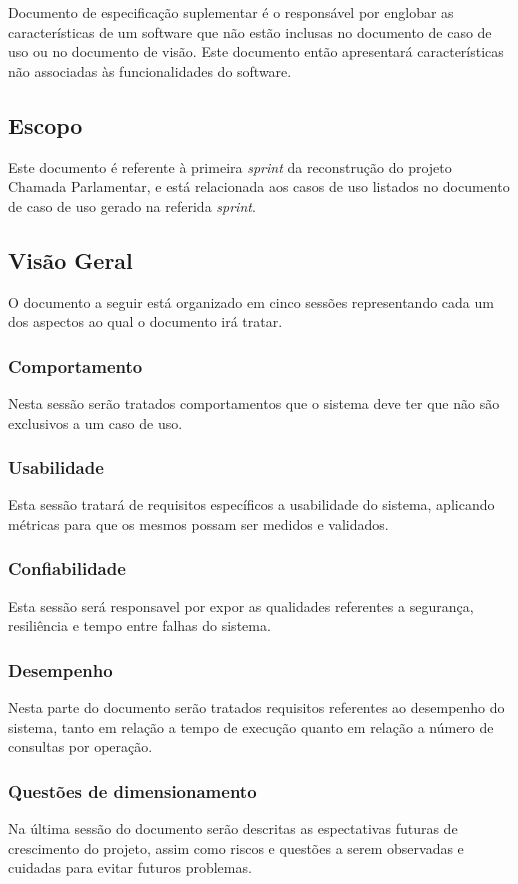 Documento de especificação suplementar é o responsável por englobar as características de um software que não estão inclusas no documento de caso de uso ou no documento de visão. Este documento então apresentará características não associadas às funcionalidades do software. 

\subsection{Escopo}

Este documento é referente à primeira \textit{sprint} da reconstrução do projeto Chamada Parlamentar, e está relacionada aos casos de uso listados no documento de caso de uso gerado na referida \textit{sprint}.

\subsection{Visão Geral}

O documento a seguir está organizado em cinco sessões representando cada um dos aspectos ao qual o documento irá tratar.

\subsubsection{Comportamento}

Nesta sessão serão tratados comportamentos que o sistema deve ter que não são exclusivos a um caso de uso.

\subsubsection{Usabilidade}

Esta sessão tratará de requisitos específicos a usabilidade do sistema, aplicando métricas para que os mesmos possam ser medidos e validados.

\subsubsection{Confiabilidade}

Esta sessão será responsavel por expor as qualidades referentes a segurança, resiliência e tempo entre falhas do sistema.

\subsubsection{Desempenho}

Nesta parte do documento serão tratados requisitos referentes ao desempenho do sistema, tanto em relação a tempo de execução quanto em relação a número de consultas por operação.

\subsubsection{Questões de dimensionamento}

Na última sessão do documento serão descritas as espectativas futuras de crescimento do projeto, assim como riscos e questões a serem observadas e cuidadas para evitar futuros problemas.